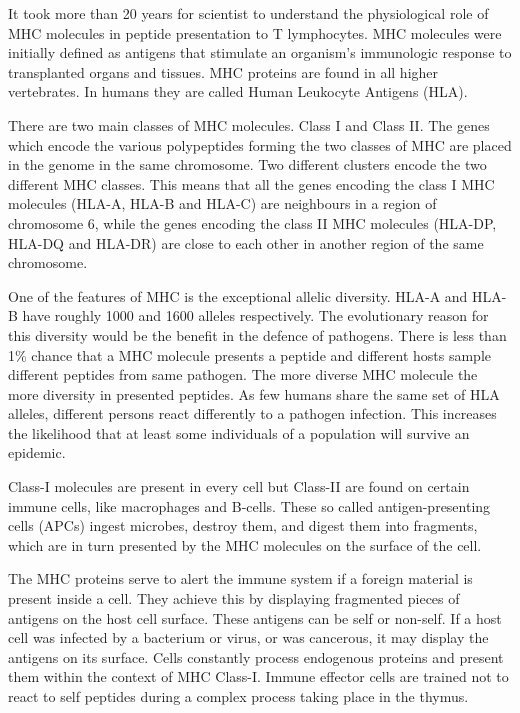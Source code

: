
It took more than 20 years for scientist to understand the  physiological role of MHC molecules\cite{wiki:MHC} in peptide presentation to T lymphocytes. 
MHC molecules were initially defined as antigens that stimulate an organism’s immunologic response to transplanted organs and tissues. MHC proteins are found in all higher vertebrates. 
In humans they are called Human Leukocyte Antigens (HLA).

There are two main classes of MHC molecules. Class I and Class II. The genes which encode the various polypeptides forming the two classes of MHC are placed in the genome in the same chromosome.
Two different clusters encode the two different MHC classes. This means that all the genes encoding the class I MHC molecules (HLA-A, HLA-B and HLA-C) are neighbours in a region of chromosome 6,
while the genes encoding the class II MHC molecules (HLA-DP, HLA-DQ and HLA-DR) are close to each other in another region of the same chromosome.

One of the features of MHC is the exceptional allelic diversity. HLA-A and HLA-B have roughly 1000 and 1600 alleles respectively. 
The evolutionary reason for this diversity would be the benefit in the defence of pathogens. 
There is less than 1\% chance that a MHC molecule presents a peptide and different hosts sample different peptides from same pathogen. 
The more diverse MHC molecule the more diversity in presented peptides. As few humans share the same set of HLA alleles, different persons react differently to a pathogen infection. 
This increases the likelihood that at least some individuals of a population will survive an epidemic.

Class-I molecules are present in every cell but Class-II are found on certain immune cells, like macrophages and B-cells. 
These so called antigen-presenting cells (APCs) ingest microbes, destroy them, and digest them into fragments, which are in turn presented by the MHC molecules on the surface of the cell.

The MHC proteins serve to alert the immune system if a foreign material is present inside a cell.
They achieve this by displaying fragmented pieces of antigens on the host cell surface. These antigens can be self or non-self. 
If a host cell was infected by a bacterium or virus, or was cancerous, it may  display the antigens on its surface.
Cells constantly process endogenous proteins and present them within the context of MHC Class-I. 
Immune effector cells are trained not to react to self peptides during a complex process taking place in the thymus.

